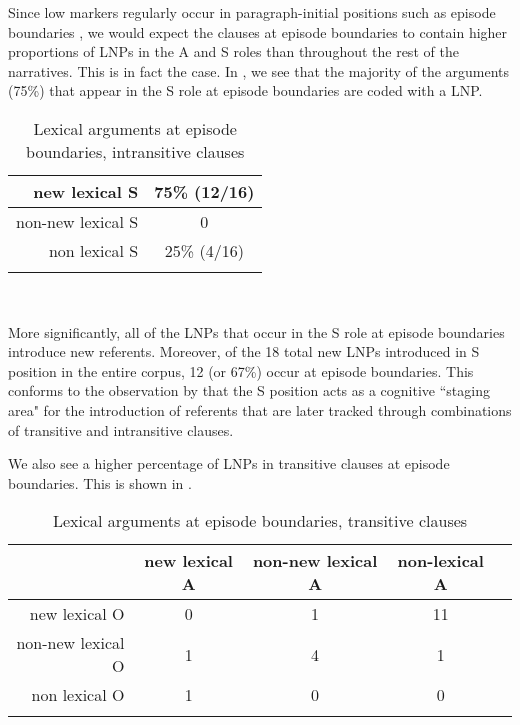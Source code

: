 Since low  markers regularly occur in paragraph-initial positions such as episode boundaries \citep[52]{ariel2001}, we would expect the clauses at episode boundaries to contain higher proportions of LNPs in the A and S roles than throughout the rest of the narratives. This is in fact the case. In , we see that the majority of the arguments (75{\%}) that appear in the S role at episode boundaries are coded with a LNP. 

\begin{table} 

\caption{{Lexical arguments at episode boundaries, intransitive clauses}}
\begin{tabular}{ r  c }
\lsptoprule
new lexical S & 75{\%} (12/16) \\

\midrule
non-new lexical S & 0 \\

\midrule
non lexical S & 25{\%} (4/16)  \\

\lspbottomrule
\end{tabular}\\
\label{episodeintr}

\end{table}

More significantly, all of the LNPs that occur in the S role at episode boundaries introduce new referents. Moreover, of the 18 total new LNPs introduced in S position in the entire corpus, 12 (or 67{\%}) occur at episode boundaries. This conforms to the observation by \citet[831]{dubois1987} that the S position acts as a cognitive ``staging area" for the introduction of referents that are later tracked through combinations of transitive and intransitive clauses.

We also see a higher percentage of LNPs in transitive clauses at episode boundaries. This is shown in .

\begin{table}

\caption{{Lexical arguments at episode boundaries, transitive clauses}}
\begin{tabular}{ r  c  c  c  c }
\lsptoprule
 & new lexical A & non-new lexical A & non-lexical A \\

\midrule
new lexical O & 0 & 1 & 11 \\

\midrule
non-new lexical O & 1 & 4  & 1  \\

\midrule
non lexical O & 1 &  0 & 0  \\

\lspbottomrule
\end{tabular}\\
\label{episodetr}

\end{table}

